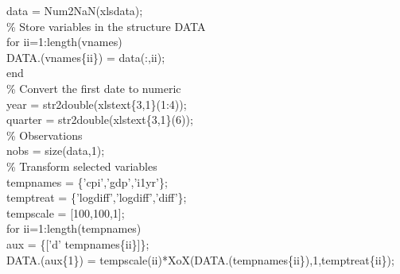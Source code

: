 \hspace{1mm}data   = Num2NaN(xlsdata); \\ 
\hspace{1mm}\textcolor{matlabgreen}{\% Store variables in the structure DATA }\\ 
\hspace{1mm}\textcolor{matlabblue}{for} ii=1:length(vnames) \\ 
\hspace{1mm}\hspace{5mm} DATA.(vnames\{ii\}) = data(:,ii); \\ 
\hspace{1mm}\textcolor{matlabblue}{end} \\ 
\hspace{1mm}\textcolor{matlabgreen}{\% Convert the first date to numeric }\\ 
\hspace{1mm}year = str2double(xlstext\{3,1\}(1:4)); \\ 
\hspace{1mm}quarter = str2double(xlstext\{3,1\}(6)); \\ 
\hspace{1mm}\textcolor{matlabgreen}{\% Observations }\\ 
\hspace{1mm}nobs = size(data,1); \\ 
\hspace{1mm}\textcolor{matlabgreen}{\% Transform selected variables }\\ 
\hspace{1mm}tempnames = \{\textcolor{matlabpurple}{'cpi'},\textcolor{matlabpurple}{'gdp'},\textcolor{matlabpurple}{'i1yr'}\}; \\ 
\hspace{1mm}temptreat = \{\textcolor{matlabpurple}{'logdiff'},\textcolor{matlabpurple}{'logdiff'},\textcolor{matlabpurple}{'diff'}\}; \\ 
\hspace{1mm}tempscale = [100,100,1]; \\ 
\hspace{1mm}\textcolor{matlabblue}{for} ii=1:length(tempnames) \\ 
\hspace{1mm}\hspace{5mm} aux = \{[\textcolor{matlabpurple}{'d'} tempnames\{ii\}]\}; \\ 
\hspace{1mm}\hspace{5mm} DATA.(aux\{1\}) = tempscale(ii)*XoX(DATA.(tempnames\{ii\}),1,temptreat\{ii\}); \\ 
